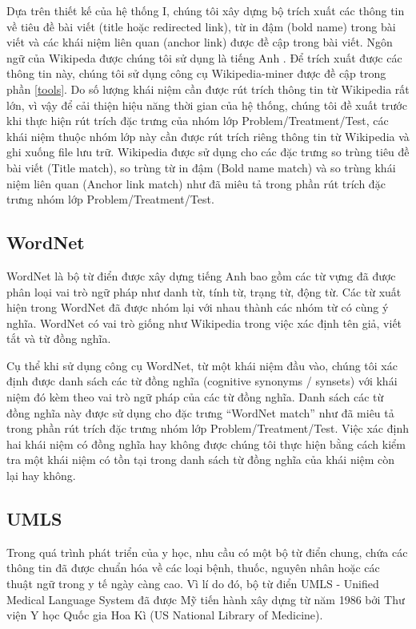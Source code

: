 Dựa trên thiết kế của hệ thống I, chúng tôi xây dựng bộ trích xuất các thông tin về tiêu đề bài viết (title hoặc redirected link), từ in đậm (bold name) trong bài viết và các khái niệm liên quan (anchor link) được đề cập trong bài viết. Ngôn ngữ của Wikipeda được chúng tôi sử dụng là tiếng Anh . Để trích xuất được các thông tin này, chúng tôi sử dụng công cụ Wikipedia-miner được đề cập trong phần \ref{tools}. Do số lượng khái niệm cần được rút trích thông tin từ Wikipedia rất lớn, vì vậy để cải thiện hiệu năng thời gian của hệ thống, chúng tôi đề xuất trước khi thực hiện rút trích đặc trưng của nhóm lớp Problem/Treatment/Test, các khái niệm thuộc nhóm lớp này cần được rút trích riêng thông tin từ Wikipedia và ghi xuống file lưu trữ. Wikipedia được sử dụng cho các đặc trưng so trùng tiêu đề bài viết (Title match), so trùng từ in đậm (Bold name match) và so trùng khái niệm liên quan (Anchor link match) như đã miêu tả trong phần rút trích đặc trưng nhóm lớp Problem/Treatment/Test.

\subsection*{WordNet}
WordNet là bộ từ điển được xây dựng tiếng Anh bao gồm các từ vựng đã được phân loại vai trò ngữ pháp như danh từ, tính từ, trạng từ, động từ. Các từ xuất hiện trong WordNet đã được nhóm lại với nhau thành các nhóm từ có cùng ý nghĩa. WordNet có vai trò giống như Wikipedia trong việc xác định tên giả, viết tắt và từ đồng nghĩa.

Cụ thể khi sử dụng công cụ WordNet, từ một khái niệm đầu vào, chúng tôi xác định được danh sách các từ đồng nghĩa (cognitive synonyms / synsets) với khái niệm đó kèm theo vai trò ngữ pháp của các từ đồng nghĩa. Danh sách các từ đồng nghĩa này được sử dụng cho đặc trưng ``WordNet match'' như đã miêu tả trong phần rút trích đặc trưng nhóm lớp Problem/Treatment/Test. Việc xác định hai khái niệm có đồng nghĩa hay không được chúng tôi thực hiện bằng cách kiểm tra một khái niệm có tồn tại trong danh sách từ đồng nghĩa của khái niệm còn lại hay không.

\subsection*{UMLS}
Trong quá trình phát triển của y học, nhu cầu có một bộ từ điển chung, chứa các thông tin đã được chuẩn hóa về các loại bệnh, thuốc, nguyên nhân hoặc các thuật ngữ trong y tế ngày càng cao. Vì lí do đó, bộ từ điển UMLS - Unified Medical Language System đã được Mỹ tiến hành xây dựng từ năm 1986 bởi Thư viện Y học Quốc gia Hoa Kì (US National Library of Medicine).

